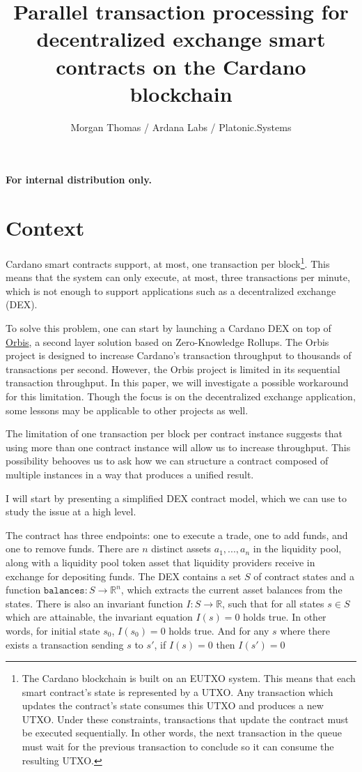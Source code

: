 \documentclass[12pt]{article}
\title{Parallel transaction processing for decentralized exchange smart contracts on the Cardano blockchain}
\author{Morgan Thomas / Ardana Labs / Platonic.Systems}
\begin{document}
\maketitle

\begin{center}
	\textbf{For internal distribution only.}
\end{center}

\section{Context}

Cardano smart contracts support, at most, one transaction per block\footnote{
  The Cardano blockchain is built on an EUTXO system.
  This means that each smart contract's state is represented by a UTXO.
  Any transaction which updates the contract's state consumes this UTXO and produces a
  new UTXO. Under these constraints, transactions that update the contract must be executed sequentially.
  In other words, the next transaction in the queue must wait for the previous
  transaction to conclude so it can consume the resulting UTXO.}.
This means that the system can only execute, at most, three transactions per
minute, which is not enough to support applications such as a decentralized
exchange (DEX).

To solve this problem, one can start by launching a Cardano DEX on top of
\href{https://orbisprotocol.com/}{Orbis}, a second layer solution based on
Zero-Knowledge Rollups.
The Orbis project is designed to increase Cardano's transaction throughput to thousands of
transactions per second.
However, the Orbis project is limited in its sequential transaction throughput.
In this paper, we will investigate a possible workaround for this limitation.
Though the focus is on the decentralized exchange application, some lessons may
be applicable to other projects as well.

The limitation of one transaction per block per contract instance suggests that using more than one contract instance will allow us to increase throughput.
This possibility behooves us to ask how we can structure a contract composed of multiple
instances in a way that produces a unified result.

I will start by presenting a simplified DEX contract model, which we can use to study the issue at a high level.

The contract has three endpoints: one to execute a trade, one to add funds, and one to remove funds. There are $n$ distinct assets $a_1,...,a_n$ in the liquidity pool, along with a liquidity pool token asset that liquidity providers receive in exchange for depositing funds. The DEX contains a set $S$ of contract states and a function $\texttt{balances} : S \to \mathbb{R}^n$,
which extracts the current asset balances from the states. There is also an invariant function $I : S \to \mathbb{R}$,
such that for all states $s \in S$ which are attainable, the invariant equation $I(s) = 0$ holds true.
In other words, for initial state $s_0$, $I(s_0) = 0$ holds true. And for any $s$ where there exists a transaction sending $s$ to $s'$, if $I(s) = 0$ then $I(s') = 0$
\end{document}
